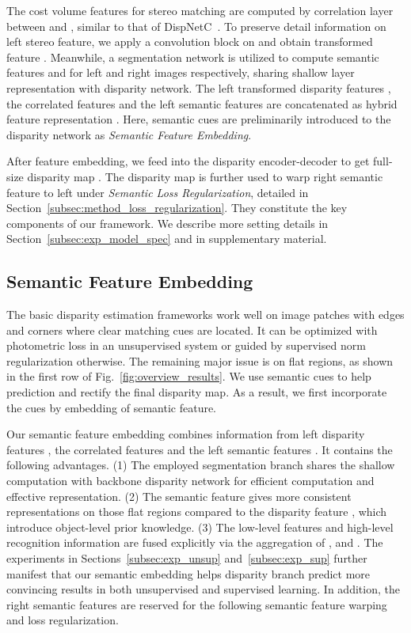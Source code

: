 \documentclass[runningheads]{llncs}
\begin{document}
The cost volume features for stereo matching  are computed by correlation layer between  and , similar to that of DispNetC~\cite{mayer2016large}. To preserve detail information on left stereo feature, we apply a convolution block on  and obtain transformed feature . Meanwhile, a segmentation network is utilized to compute semantic features  and  for left and right images respectively, sharing shallow layer representation with disparity network. The left transformed disparity features , the correlated features  and the left semantic features  are concatenated as hybrid feature representation . Here, semantic cues are preliminarily introduced to the disparity network as \emph{Semantic Feature Embedding}.

After feature embedding, we feed  into the disparity encoder-decoder to get full-size disparity map . The disparity map is further used to warp right semantic feature  to left under \emph{Semantic Loss Regularization}, detailed in Section~\ref{subsec:method_loss_regularization}. They constitute the key components of our framework. We describe more setting details in Section~\ref{subsec:exp_model_spec} and in supplementary material.

\subsection{Semantic Feature Embedding}\label{subsec:method_feature_embedding}

The basic disparity estimation frameworks work well on image patches with edges and corners where clear matching cues are located. It can be optimized with photometric loss in an unsupervised system or guided by supervised  norm regularization otherwise. The remaining major issue is on flat regions, as shown in the first row of Fig.~\ref{fig:overview_results}. We use semantic cues to help prediction and rectify the final disparity map. As a result, we first incorporate the cues by embedding of semantic feature.

Our semantic feature embedding combines information from left disparity features , the correlated features  and the left semantic features . It contains the following advantages. (1) The employed segmentation branch shares the shallow computation with backbone disparity network for efficient computation and effective representation. (2) The semantic feature  gives more consistent representations on those flat regions compared to the disparity feature , which introduce object-level prior knowledge. (3) The low-level features and high-level recognition information are fused explicitly via the aggregation of ,  and . The experiments in Sections~\ref{subsec:exp_unsup} and~\ref{subsec:exp_sup} further manifest that our semantic embedding helps disparity branch predict more convincing results in both unsupervised and supervised learning. In addition, the right semantic features  are reserved for the following semantic feature warping and loss regularization. 
\end{document}
